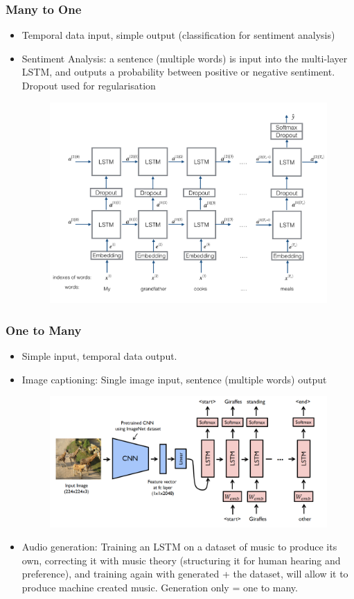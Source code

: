 \subsubsection{Many to One}
\begin{itemize}
    \item Temporal data input, simple output (classification for sentiment analysis)
    \item Sentiment Analysis: a sentence (multiple words) is input into the multi-layer LSTM, and outputs a probability between positive or negative sentiment. Dropout used for regularisation
    \begin{figure}[H]
        \centering
        \includegraphics[width=0.65\linewidth]{img/sentiment_analysis.png}
    \end{figure}
\end{itemize}
\subsubsection{One to Many}
\begin{itemize}
    \item Simple input, temporal data output.
    \item Image captioning: Single image input, sentence (multiple words) output
    \begin{figure}[H]
        \centering
        \includegraphics[width=0.75\linewidth]{img/lstm_image_captioning.png}
    \end{figure}
    \item Audio generation: Training an LSTM on a dataset of music to produce its own, correcting it with music theory (structuring it for human hearing and preference), and training again with generated + the dataset, will allow it to produce machine created music. Generation only = one to many.
\end{itemize}


